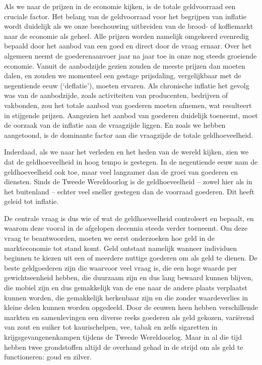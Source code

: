 \documentclass[
  a5paper,
  smalldemyvopaper,10pt,twoside,onecolumn,openright,extrafontsizes,hidelinks]{memoir}
\begin{document}
Als we naar de prijzen in de economie kijken, is de totale geldvoorraad
een cruciale factor. Het belang van de geldvoorraad voor het begrijpen
van inflatie wordt duidelijk als we onze beschouwing uitbreiden van de
brood- of koffiemarkt naar de economie als geheel. Alle prijzen worden
namelijk omgekeerd evenredig bepaald door het aanbod van een goed en
direct door de vraag ernaar. Over het algemeen neemt de goederenaanvoer
jaar na jaar toe in onze nog steeds groeiende economie. Vanuit de
aanbodzijde gezien zouden de meeste prijzen dan moeten dalen, en zouden
we momenteel een gestage prijsdaling, vergelijkbaar met de negentiende
eeuw (`deflatie'), moeten ervaren. Als chronische inflatie het gevolg
was van de aanbodzijde, zoals activiteiten van producenten, bedrijven of
vakbonden, zou het totale aanbod van goederen moeten afnemen, wat
resulteert in stijgende prijzen. Aangezien het aanbod van goederen
duidelijk toeneemt, moet de oorzaak van de inflatie aan de vraagzijde
liggen. En zoals we hebben aangetoond, is de dominante factor aan die
vraagzijde de totale geldhoeveelheid.

Inderdaad, als we naar het verleden en het heden van de wereld kijken,
zien we dat de geldhoeveelheid in hoog tempo is gestegen. In de
negentiende eeuw nam de geldhoeveelheid ook toe, maar veel langzamer dan
de groei van goederen en diensten. Sinds de Tweede Wereldoorlog is de
geldhoeveelheid -- zowel hier als in het buitenland -- echter veel
sneller gestegen dan de voorraad goederen. Dit heeft geleid tot
inflatie.

De centrale vraag is dus wie of wat de geldhoeveelheid controleert en
bepaalt, en waarom deze vooral in de afgelopen decennia steeds verder
toeneemt. Om deze vraag te beantwoorden, moeten we eerst onderzoeken hoe
geld in de markteconomie tot stand komt. Geld ontstaat namelijk wanneer
individuen beginnen te kiezen uit een of meerdere nuttige goederen om
als geld te dienen. De beste geldgoederen zijn die waarvoor veel vraag
is, die een hoge waarde per gewichtseenheid hebben, die duurzaam zijn en
dus lang bewaard kunnen blijven, die mobiel zijn en dus gemakkelijk van
de ene naar de andere plaats verplaatst kunnen worden, die gemakkelijk
herkenbaar zijn en die zonder waardeverlies in kleine delen kunnen
worden opgedeeld. Door de eeuwen heen hebben verschillende markten en
samenlevingen een diverse reeks goederen als geld gekozen, variërend van
zout en suiker tot kaurischelpen, vee, tabak en zelfs sigaretten in
krijgsgevangenenkampen tijdens de Tweede Wereldoorlog. Maar in al die
tijd hebben twee grondstoffen altijd de overhand gehad in de strijd om
als geld te functioneren: goud en zilver.
\end{document}
